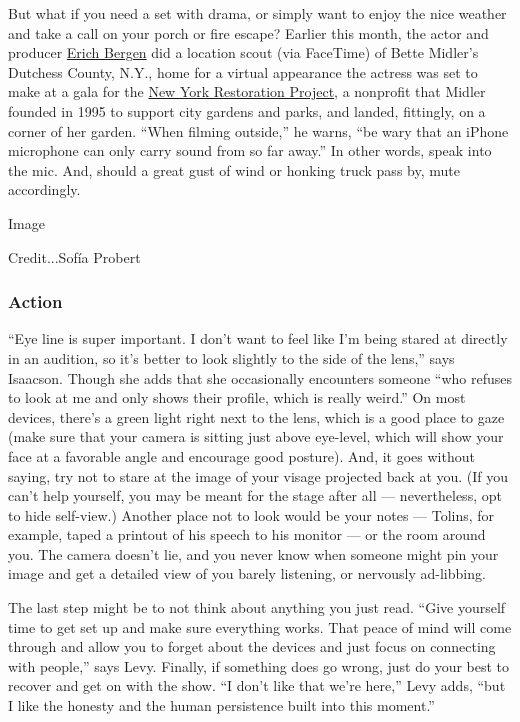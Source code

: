 But what if you need a set with drama, or simply want to enjoy the nice
weather and take a call on your porch or fire escape? Earlier this
month, the actor and producer
\href{https://www.instagram.com/erichbergen/?hl=en}{Erich Bergen} did a
location scout (via FaceTime) of Bette Midler's Dutchess County, N.Y.,
home for a virtual appearance the actress was set to make at a gala for
the \href{https://www.nyrp.org/}{New York Restoration Project}, a
nonprofit that Midler founded in 1995 to support city gardens and parks,
and landed, fittingly, on a corner of her garden. ``When filming
outside,'' he warns, ``be wary that an iPhone microphone can only carry
sound from so far away.'' In other words, speak into the mic. And,
should a great gust of wind or honking truck pass by, mute accordingly.

Image

Credit...Sofía Probert

\hypertarget{action}{%
\subsubsection{\texorpdfstring{\textbf{Action}}{Action}}\label{action}}

``Eye line is super important. I don't want to feel like I'm being
stared at directly in an audition, so it's better to look slightly to
the side of the lens,'' says Isaacson. Though she adds that she
occasionally encounters someone ``who refuses to look at me and only
shows their profile, which is really weird.'' On most devices, there's a
green light right next to the lens, which is a good place to gaze (make
sure that your camera is sitting just above eye-level, which will show
your face at a favorable angle and encourage good posture). And, it goes
without saying, try not to stare at the image of your visage projected
back at you. (If you can't help yourself, you may be meant for the stage
after all --- nevertheless, opt to hide self-view.) Another place not to
look would be your notes --- Tolins, for example, taped a printout of
his speech to his monitor --- or the room around you. The camera doesn't
lie, and you never know when someone might pin your image and get a
detailed view of you barely listening, or nervously ad-libbing.

The last step might be to not think about anything you just read. ``Give
yourself time to get set up and make sure everything works. That peace
of mind will come through and allow you to forget about the devices and
just focus on connecting with people,'' says Levy. Finally, if something
does go wrong, just do your best to recover and get on with the show.
``I don't like that we're here,'' Levy adds, ``but I like the honesty
and the human persistence built into this moment.''

